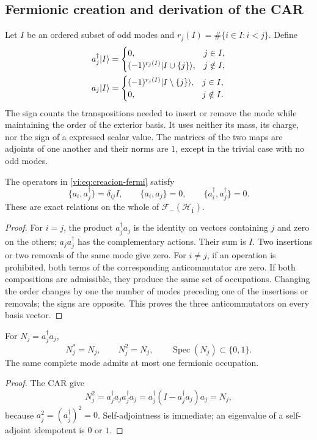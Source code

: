 \subsection{Fermionic creation and derivation of the CAR}
\label{vi:subsec:car-construccion}

Let \(I\) be an ordered subset of odd modes and
\(r_j(I)=\#\{i\in I:i<j\}\). Define
\begin{align}
 a_j^\dagger|I\rangle&=
 \begin{cases}
 0,&j\in I,\\
 (-1)^{r_j(I)}|I\cup\{j\}\rangle,&j\notin I,
 \end{cases}\notag\\
 a_j|I\rangle&=
 \begin{cases}
 (-1)^{r_j(I)}|I\setminus\{j\}\rangle,&j\in I,\\
 0,&j\notin I.
 \end{cases}
 \label{vi:eq:creacion-fermi}
\end{align}
The sign counts the transpositions needed to insert or remove the mode
while maintaining the order of the exterior basis. It uses neither its
mass, its charge, nor the sign of a expressed scalar value.
The matrices of the two maps are adjoints of one another and their norms
are \(1\), except in the trivial case with no odd modes.

\begin{theorem}
\label{vi:thm:car-construidas}
The operators in \eqref{vi:eq:creacion-fermi} satisfy
\[
 \{a_i,a_j^\dagger\}=\delta_{ij}I,\qquad
 \{a_i,a_j\}=0,\qquad
 \{a_i^\dagger,a_j^\dagger\}=0.
\]
These are exact relations on the whole of
\(\mathcal F_-(\mathcal H_{\bar1})\).
\end{theorem}
\begin{proof}
For \(i=j\), the product \(a_j^\dagger a_j\) is the identity
on vectors containing \(j\) and zero on the others;
\(a_ja_j^\dagger\) has the complementary actions. Their sum
is \(I\). Two insertions or two removals of the same mode give zero.
For \(i\ne j\), if an operation is prohibited, both terms of
the corresponding anticommutator are zero. If both compositions are
admissible, they produce the same set of occupations.
Changing the order changes by one the number of modes preceding one
of the insertions or removals; the signs are opposite.
This proves the three anticommutators on every basis vector.
\end{proof}

\begin{corollary}
\label{vi:cor:pauli-ocupacion}
For \(N_j=a_j^\dagger a_j\),
\[
 N_j^*=N_j,\qquad N_j^2=N_j,\qquad
 \operatorname{Spec}(N_j)\subset\{0,1\}.
\]
The same complete mode admits at most one fermionic occupation.
\end{corollary}
\begin{proof}
The CAR give
\[
 N_j^2=a_j^\dagger a_ja_j^\dagger a_j
 =a_j^\dagger(I-a_j^\dagger a_j)a_j=N_j,
\]
because \(a_j^2=(a_j^\dagger)^2=0\). Self-adjointness is immediate;
an eigenvalue of a self-adjoint idempotent is \(0\) or \(1\).
\end{proof}

